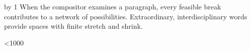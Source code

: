 
\hsize=12pc
\vsize=54pc
\emergencystretch=0pt
\parindent=12pt
\parskip=0pt
\countdef{}

\def\sampleparagraph{%
When the compositor examines a paragraph, every feasible break contributes
to a network of possibilities.  Extra\-ordinary, inter\-disciplinary words
provide spaces with finite stretch and shrink.\par}

\def\work{%
  \advance\paragraphs by 1
  \sampleparagraph
  \ifnum\paragraphs<1000 \expandafter\work\fi
}
\work
{}
\benchmarkbye

